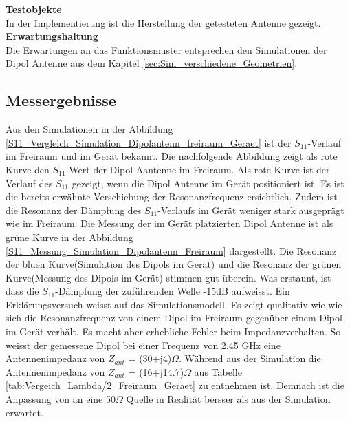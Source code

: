 \textbf{Testobjekte}\\
In der Implementierung ist die Herstellung der getesteten Antenne gezeigt. \\ 
\textbf{Erwartungshaltung}\\
Die Erwartungen an das Funktionsmuster entsprechen den Simulationen der Dipol Antenne aus dem Kapitel \ref{sec:Sim_verschiedene_Geometrien}.\\

\subsection{Messergebnisse}
\label{sec:Messergebinsse}
Aus den Simulationen in der Abbildung \ref{S11_Vergleich_Simulation_Dipolantenn_freiraum_Geraet} ist der $S_{11}$-Verlauf im Freiraum und im Gerät bekannt. Die nachfolgende Abbildung zeigt als rote Kurve den $S_{11}$-Wert der Dipol Aantenne im Freiraum. Als rote Kurve ist der Verlauf des $S_{11}$ gezeigt, wenn die Dipol Antenne im Gerät positioniert ist. Es ist die bereits erwähnte Verschiebung der Resonanzfrequenz ersichtlich. Zudem ist die Resonanz der Dämpfung des $S_{11}$-Verlaufs im Gerät weniger stark ausgeprägt wie im Freiraum. Die Messung der im Gerät platzierten Dipol Antenne ist als grüne Kurve in der Abbildung \ref{S11_Messung_Simulation_Dipolantenn_Freiraum} dargestellt. Die Resonanz der bluen Kurve(Simulation des Dipols im Gerät) und die Resonanz der grünen Kurve(Messung des Dipols im Gerät) stimmen gut überein. Was erstaunt, ist dass die $S_{11}$-Dämpfung der zuführenden Welle -15dB aufweisst. Ein Erklärungsversuch weisst auf das Simulationsmodell. Es zeigt qualitativ wie wie sich die Resonanzfrequenz von einem Dipol im Freiraum gegenüber einem Dipol im Gerät verhält. Es macht aber erhebliche Fehler beim Impedanzverhalten. So weisst der gemessene Dipol bei einer Frequenz von 2.45 GHz eine Antennenimpedanz von $Z_{ant}$ = (30+j4)$\Omega$. Während aus der Simulation die Antennenimpedanz von $Z_{ant}$ = (16+j14.7)$\Omega$ aus Tabelle \ref{tab:Vergeich_Lambda/2_Freiraum_Geraet} zu entnehmen ist. Demnach ist die Anpassung von an eine 50$\Omega$ Quelle in Realität bersser als aus der Simulation erwartet.


%	

